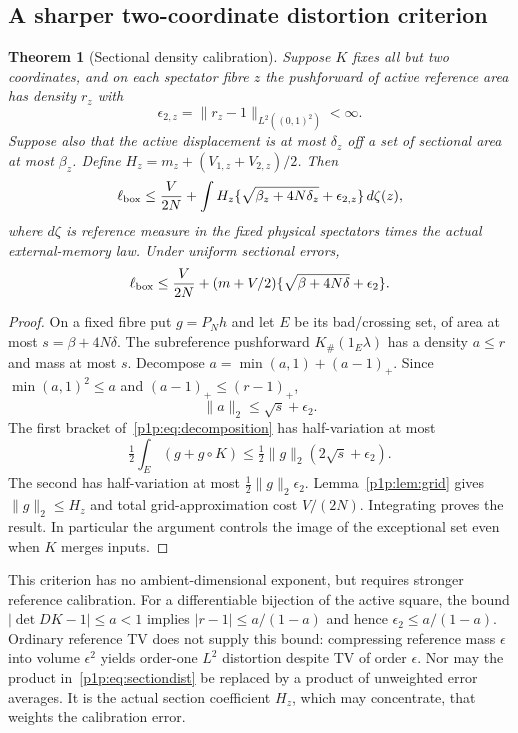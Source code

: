 \documentclass[11pt]{article}
\numberwithin{equation}{section}
\newtheorem{theorem}{Theorem}[section]
\theoremstyle{definition}
\theoremstyle{remark}
\begin{document}
\subsection{A sharper two-coordinate distortion criterion}

\begin{theorem}[Sectional density calibration]\label{p1p:thm:sectiondist}
Suppose $K$ fixes all but two coordinates, and on each spectator fibre
$z$ the pushforward of active reference area has density $r_z$ with
\[
 \epsilon_{2,z}=\|r_z-1\|_{L^2((0,1)^2)}<\infty.
\]
Suppose also that the active displacement is at most $\delta_z$ off a
set of sectional area at most $\beta_z$. Define
$H_z=m_z+(V_{1,z}+V_{2,z})/2$. Then
\begin{equation}\label{p1p:eq:sectiondist}
 \ell_{\rm box}\leq\frac{V}{2N}
 +\int H_z\{\sqrt{\beta_z+4N\delta_z}+\epsilon_{2,z}\}\,d\zeta(z),
\end{equation}
where $d\zeta$ is reference measure in the fixed physical spectators
times the actual external-memory law. Under uniform sectional errors,
\begin{equation}\label{p1p:eq:sectionuniform}
 \ell_{\rm box}\leq\frac{V}{2N}
 +(m+V/2)\{\sqrt{\beta+4N\delta}+\epsilon_2\}.
\end{equation}
\end{theorem}
\begin{proof}
On a fixed fibre put $g=P_Nh$ and let $E$ be its bad/crossing set, of
area at most $s=\beta+4N\delta$. The subreference pushforward
$K_\#(1_E\lambda)$ has a density $a\leq r$ and mass at most $s$.
Decompose $a=\min(a,1)+(a-1)_+$. Since
$\min(a,1)^2\leq a$ and $(a-1)_+\leq(r-1)_+$,
\[
 \|a\|_2\leq\sqrt s+\epsilon_2.
\]
The first bracket of~\eqref{p1p:eq:decomposition} has half-variation at
most
\[
 \tfrac12\int_E(g+g\circ K)
 \leq\tfrac12\|g\|_2(2\sqrt s+\epsilon_2).
\]
The second has half-variation at most
$\frac12\|g\|_2\epsilon_2$. Lemma~\ref{p1p:lem:grid} gives
$\|g\|_2\leq H_z$ and total grid-approximation cost $V/(2N)$.
Integrating proves the result. In particular the argument controls
the image of the exceptional set even when $K$ merges inputs.
\end{proof}

This criterion has no ambient-dimensional exponent, but requires
stronger reference calibration. For a differentiable bijection of the
active square, the bound $|\det DK-1|\leq a<1$ implies
$|r-1|\leq a/(1-a)$ and hence $\epsilon_2\leq a/(1-a)$.
Ordinary reference TV does not supply this bound: compressing reference
mass $\epsilon$ into volume $\epsilon^2$ yields order-one $L^2$
distortion despite TV of order $\epsilon$.
Nor may the product in~\eqref{p1p:eq:sectiondist} be replaced by a product
of unweighted error averages. It is the actual section coefficient
$H_z$, which may concentrate, that weights the calibration error.
\end{document}
